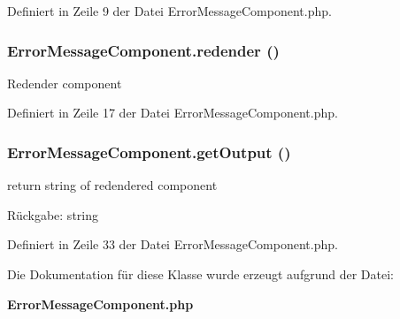Definiert in Zeile 9 der Datei ErrorMessageComponent.php.
\subsubsection{\setlength{\rightskip}{0pt plus 5cm}ErrorMessageComponent.redender ()}\label{classErrorMessageComponent_52fef8c30b1f7359629e35d179e0663b}


Redender component 

Definiert in Zeile 17 der Datei ErrorMessageComponent.php.
\subsubsection{\setlength{\rightskip}{0pt plus 5cm}ErrorMessageComponent.getOutput ()}\label{classErrorMessageComponent_09fb53a235cb49ba3da7ff55c8f4b777}


return string of redendered component

\begin{Desc}
\item[Rückgabe:]string \end{Desc}


Definiert in Zeile 33 der Datei ErrorMessageComponent.php.

Die Dokumentation für diese Klasse wurde erzeugt aufgrund der Datei:\begin{CompactItemize}
\item 
{\bf ErrorMessageComponent.php}\end{CompactItemize}
